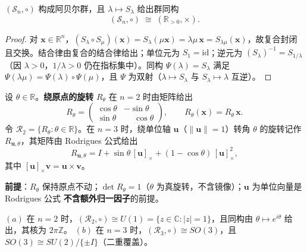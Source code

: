 \begin{lemma}[缩放群的群结构]\label{lem:scaling_group}
$(\mathcal{S}_n, \circ)$ 构成阿贝尔群，且 $\lambda \mapsto S_{\lambda}$ 给出群同构
\[
(\mathcal{S}_n, \circ) \;\cong\; (\mathbb{R}_{>0}, \times).
\]
\end{lemma}

\begin{proof}
对 $\mathbf{x}\in\mathbb R^n$，$(S_\lambda \circ S_\mu)(\mathbf{x}) = S_\lambda(\mu\mathbf{x}) = \lambda\mu\,\mathbf{x} = S_{\lambda\mu}(\mathbf{x})$，故复合封闭且交换。结合律由复合的结合律给出；单位元为 $S_1=\mathrm{id}$；逆元为 $(S_\lambda)^{-1}=S_{1/\lambda}$（因 $\lambda>0$，$1/\lambda>0$ 仍在指标集中）。同构 $\Psi(\lambda)=S_\lambda$ 满足 $\Psi(\lambda\mu)=\Psi(\lambda)\circ\Psi(\mu)$，且 $\Psi$ 为双射（$\lambda\mapsto S_\lambda$ 与 $S_\lambda\mapsto\lambda$ 互逆）。
\end{proof}

\begin{definition}[旋转变换与旋转群]\label{def:rotation_map}
设 $\theta \in \mathbb{R}$。\textbf{绕原点的旋转} $R_\theta$ 在 $n=2$ 时由矩阵给出
\[
R_\theta =
\begin{pmatrix}
\cos\theta & -\sin\theta \\
\sin\theta & \phantom{-}\cos\theta
\end{pmatrix},
\qquad
R_\theta(\mathbf{x}) = R_\theta\,\mathbf{x}.
\]
令 $\mathcal{R}_2 = \{R_\theta : \theta \in \mathbb{R}\}$。在 $n=3$ 时，绕单位轴 $\mathbf{u}$（$\|\mathbf{u}\|=1$）转角 $\theta$ 的旋转记作 $R_{\mathbf{u},\theta}$，其矩阵由 Rodrigues 公式给出
\[
R_{\mathbf{u},\theta}
= I + \sin\theta\,[\mathbf{u}]_\times + (1-\cos\theta)\,[\mathbf{u}]_\times^2,
\]
其中 $[\mathbf{u}]_\times \mathbf{v} = \mathbf{u}\times\mathbf{v}$。

\textbf{前提}：$R_\theta$ 保持原点不动；$\det R_\theta = 1$（$\theta$ 为真旋转，不含镜像）；$\mathbf u$ 为单位向量是 Rodrigues 公式 \textbf{不含额外归一因子}的前提。
\end{definition}

\begin{lemma}[旋转群与圆群同构]\label{lem:rotation_group}
$(a)$ 在 $n=2$ 时，$(\mathcal{R}_2, \circ) \cong U(1) = \{z \in \mathbb{C} : |z| = 1\}$，且同构由 $\theta \mapsto e^{i\theta}$ 给出，其核为 $2\pi\mathbb{Z}$。
$(b)$ 在 $n=3$ 时，$(\mathcal{R}_3,\circ)\cong SO(3)$，且 $SO(3) \cong SU(2)/\{\pm I\}$（二重覆盖）。
\end{lemma}


